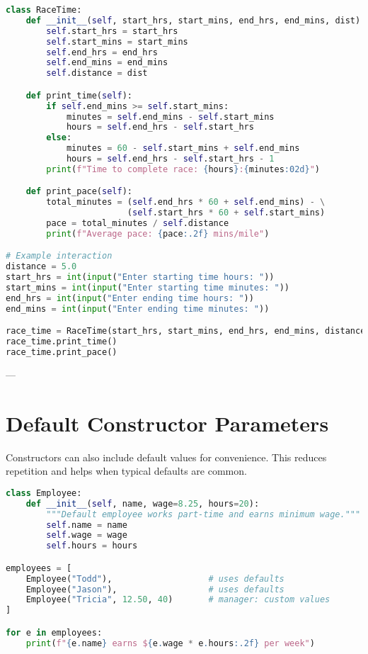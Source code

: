 \begin{lstlisting}[language=Python, caption={RaceTime class with methods.}]
class RaceTime:
    def __init__(self, start_hrs, start_mins, end_hrs, end_mins, dist):
        self.start_hrs = start_hrs
        self.start_mins = start_mins
        self.end_hrs = end_hrs
        self.end_mins = end_mins
        self.distance = dist

    def print_time(self):
        if self.end_mins >= self.start_mins:
            minutes = self.end_mins - self.start_mins
            hours = self.end_hrs - self.start_hrs
        else:
            minutes = 60 - self.start_mins + self.end_mins
            hours = self.end_hrs - self.start_hrs - 1
        print(f"Time to complete race: {hours}:{minutes:02d}")

    def print_pace(self):
        total_minutes = (self.end_hrs * 60 + self.end_mins) - \
                        (self.start_hrs * 60 + self.start_mins)
        pace = total_minutes / self.distance
        print(f"Average pace: {pace:.2f} mins/mile")

# Example interaction
distance = 5.0
start_hrs = int(input("Enter starting time hours: "))
start_mins = int(input("Enter starting time minutes: "))
end_hrs = int(input("Enter ending time hours: "))
end_mins = int(input("Enter ending time minutes: "))

race_time = RaceTime(start_hrs, start_mins, end_hrs, end_mins, distance)
race_time.print_time()
race_time.print_pace()
\end{lstlisting}

---

\section*{Default Constructor Parameters}

Constructors can also include default values for convenience.  
This reduces repetition and helps when typical defaults are common.

\begin{lstlisting}[language=Python, caption={Employee class with default parameters.}]
class Employee:
    def __init__(self, name, wage=8.25, hours=20):
        """Default employee works part-time and earns minimum wage."""
        self.name = name
        self.wage = wage
        self.hours = hours

employees = [
    Employee("Todd"),                   # uses defaults
    Employee("Jason"),                  # uses defaults
    Employee("Tricia", 12.50, 40)       # manager: custom values
]

for e in employees:
    print(f"{e.name} earns ${e.wage * e.hours:.2f} per week")
\end{lstlisting}

